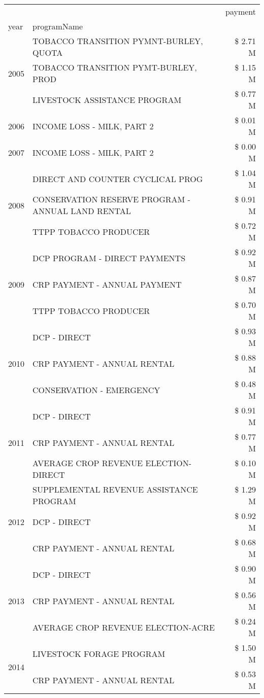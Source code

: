\begin{tabular}{llr}
\toprule
 &  & payment \\
year & programName &  \\
\midrule
\multirow[t]{3}{*}{2005} & TOBACCO TRANSITION PYMNT-BURLEY, QUOTA & \$ 2.71 M \\
 & TOBACCO TRANSITION PYMT-BURLEY, PROD & \$ 1.15 M \\
 & LIVESTOCK ASSISTANCE PROGRAM & \$ 0.77 M \\
\cline{1-3}
2006 & INCOME LOSS - MILK, PART 2 & \$ 0.01 M \\
\cline{1-3}
2007 & INCOME LOSS - MILK, PART 2 & \$ 0.00 M \\
\cline{1-3}
\multirow[t]{3}{*}{2008} & DIRECT AND COUNTER CYCLICAL PROG & \$ 1.04 M \\
 & CONSERVATION RESERVE PROGRAM - ANNUAL LAND RENTAL & \$ 0.91 M \\
 & TTPP TOBACCO PRODUCER & \$ 0.72 M \\
\cline{1-3}
\multirow[t]{3}{*}{2009} & DCP PROGRAM - DIRECT PAYMENTS & \$ 0.92 M \\
 & CRP PAYMENT - ANNUAL PAYMENT & \$ 0.87 M \\
 & TTPP TOBACCO PRODUCER & \$ 0.70 M \\
\cline{1-3}
\multirow[t]{3}{*}{2010} & DCP - DIRECT & \$ 0.93 M \\
 & CRP PAYMENT - ANNUAL RENTAL & \$ 0.88 M \\
 & CONSERVATION - EMERGENCY & \$ 0.48 M \\
\cline{1-3}
\multirow[t]{3}{*}{2011} & DCP - DIRECT & \$ 0.91 M \\
 & CRP PAYMENT - ANNUAL RENTAL & \$ 0.77 M \\
 & AVERAGE CROP REVENUE ELECTION-DIRECT & \$ 0.10 M \\
\cline{1-3}
\multirow[t]{3}{*}{2012} & SUPPLEMENTAL REVENUE ASSISTANCE PROGRAM & \$ 1.29 M \\
 & DCP - DIRECT & \$ 0.92 M \\
 & CRP PAYMENT - ANNUAL RENTAL & \$ 0.68 M \\
\cline{1-3}
\multirow[t]{3}{*}{2013} & DCP - DIRECT & \$ 0.90 M \\
 & CRP PAYMENT - ANNUAL RENTAL & \$ 0.56 M \\
 & AVERAGE CROP REVENUE ELECTION-ACRE & \$ 0.24 M \\
\cline{1-3}
\multirow[t]{3}{*}{2014} & LIVESTOCK FORAGE PROGRAM & \$ 1.50 M \\
 & CRP PAYMENT - ANNUAL RENTAL & \$ 0.53 M \\

\end{tabular}
